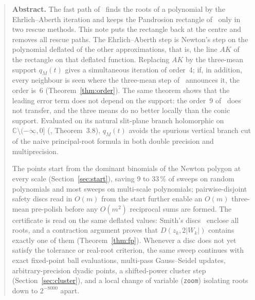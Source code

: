 \documentclass[10pt,a4paper]{article}
\theoremstyle{definition}
\numberwithin{equation}{section}
\newcommand{\C}{\mathbb{C}}
\begin{document}
\vspace{6pt}
\begin{quote}\small
\textbf{Abstract.}
The fast path of~\cite{g7} finds the roots of a polynomial by the Ehrlich--Aberth iteration and keeps the Pandrosion rectangle of~\cite{v31} only in two rescue methods. This note puts the rectangle back at the centre and removes all rescue paths. The Ehrlich--Aberth step is Newton's step on the polynomial deflated of the other approximations, that is, the line $AK$ of the rectangle on that deflated function. Replacing $AK$ by the three-mean support $q_M(t)$ gives a simultaneous iteration of order~4; if, in addition, every neighbour is seen where the three-mean step of~\cite{g2} announces it, the order is~6 (Theorem~\ref{thm:order}). The same theorem shows that the leading error term does not depend on the support: the order~9 of~\cite{v31} does not transfer, and the three means do no better locally than the conic support. Evaluated on its natural slit-plane branch holomorphic on $\C\setminus(-\infty,0]$ (\cite{c5}, Theorem~3.8), $q_M(t)$ avoids the spurious vertical branch cut of the naive principal-root formula in both double precision and multiprecision.

The points start from the dominant binomials of the Newton polygon at every scale (Section~\ref{sec:start}), saving 9 to 33\,\% of sweeps on random polynomials and most sweeps on multi-scale polynomials; pairwise-disjoint safety discs read in $O(m)$ from the start further enable an $O(m)$ three-mean pre-polish before any $O(m^2)$ reciprocal sums are formed. The certificate is read on the same deflated values: Smith's discs~\cite{smith} enclose all roots, and a contraction argument proves that $D(z_k,2|W_k|)$ contains exactly one of them (Theorem~\ref{thm:fp}). Whenever a disc does not yet satisfy the tolerance or real-root criterion, the same sweep continues with exact fixed-point ball evaluations, multi-pass Gauss--Seidel updates, arbitrary-precision dyadic points, a shifted-power cluster step (Section~\ref{sec:cluster}), and a local change of variable (\texttt{zoom}) isolating roots down to $2^{-8000}$ apart.


\end{quote}
\end{document}
